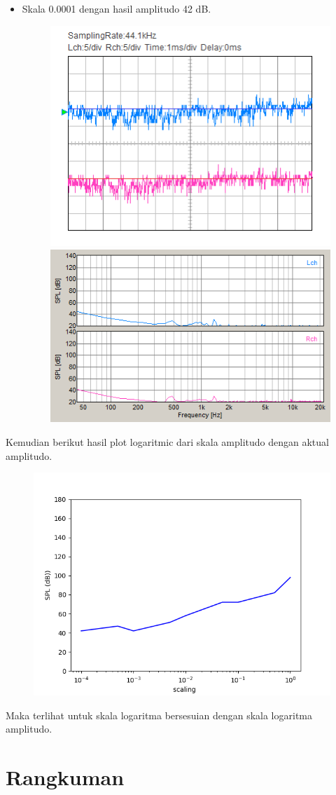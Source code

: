 \documentclass[12pt,]{article}
\begin{document}
\begin{itemize}
		\newpage
		\item Skala 0.0001 dengan hasil amplitudo 42 dB.
		\begin{figure}[H]
			\centering
			\includegraphics[width=0.45\linewidth]{result/day_4/500Hz/tone00001}
			\includegraphics[width=0.45\linewidth]{result/day_4/500Hz/fft_tone00001}
		\end{figure}
	\end{itemize}

	Kemudian berikut hasil plot logaritmic dari skala amplitudo dengan aktual amplitudo.
	\begin{figure}[H]
		\centering
		\includegraphics[width=0.75\linewidth]{result/analisa/ampl_scaling}
	\end{figure}
	Maka terlihat untuk skala logaritma bersesuian dengan skala logaritma amplitudo.
	
	\newpage
	\section{Rangkuman}
	
\end{document}
